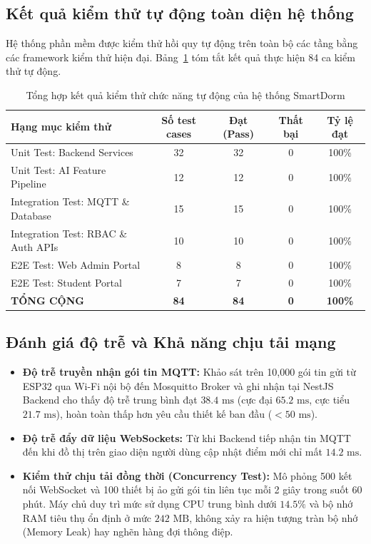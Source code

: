 \subsection{Kết quả kiểm thử tự động toàn diện hệ thống}
Hệ thống phần mềm được kiểm thử hồi quy tự động trên toàn bộ các tầng bằng các framework kiểm thử hiện đại. Bảng~\ref{tab:test_summary} tóm tắt kết quả thực hiện 84 ca kiểm thử tự động.

\begin{table}[H]
\centering
\caption{Tổng hợp kết quả kiểm thử chức năng tự động của hệ thống SmartDorm}
\label{tab:test_summary}
\begin{tabular}{|l|c|c|c|c|}
\hline
\textbf{Hạng mục kiểm thử} & \textbf{Số test cases} & \textbf{Đạt (Pass)} & \textbf{Thất bại} & \textbf{Tỷ lệ đạt} \\
\hline
Unit Test: Backend Services & 32 & 32 & 0 & 100\% \\
\hline
Unit Test: AI Feature Pipeline & 12 & 12 & 0 & 100\% \\
\hline
Integration Test: MQTT \& Database & 15 & 15 & 0 & 100\% \\
\hline
Integration Test: RBAC \& Auth APIs & 10 & 10 & 0 & 100\% \\
\hline
E2E Test: Web Admin Portal & 8 & 8 & 0 & 100\% \\
\hline
E2E Test: Student Portal & 7 & 7 & 0 & 100\% \\
\hline
\textbf{TỔNG CỘNG} & \textbf{84} & \textbf{84} & \textbf{0} & \textbf{100\%} \\
\hline
\end{tabular}
\end{table}

\subsection{Đánh giá độ trễ và Khả năng chịu tải mạng}
\begin{itemize}
    \item \textbf{Độ trễ truyền nhận gói tin MQTT:} Khảo sát trên 10,000 gói tin gửi từ ESP32 qua Wi-Fi nội bộ đến Mosquitto Broker và ghi nhận tại NestJS Backend cho thấy độ trễ trung bình đạt $38.4\text{ ms}$ (cực đại $65.2\text{ ms}$, cực tiểu $21.7\text{ ms}$), hoàn toàn thấp hơn yêu cầu thiết kế ban đầu ($< 50\text{ ms}$).
    \item \textbf{Độ trễ đẩy dữ liệu WebSockets:} Từ khi Backend tiếp nhận tin MQTT đến khi đồ thị trên giao diện người dùng cập nhật điểm mới chỉ mất $14.2\text{ ms}$.
    \item \textbf{Kiểm thử chịu tải đồng thời (Concurrency Test):} Mô phỏng 500 kết nối WebSocket và 100 thiết bị ảo gửi gói tin liên tục mỗi 2 giây trong suốt 60 phút. Máy chủ duy trì mức sử dụng CPU trung bình dưới $14.5\%$ và bộ nhớ RAM tiêu thụ ổn định ở mức $242\text{ MB}$, không xảy ra hiện tượng tràn bộ nhớ (Memory Leak) hay nghẽn hàng đợi thông điệp.
\end{itemize}
\newpage
